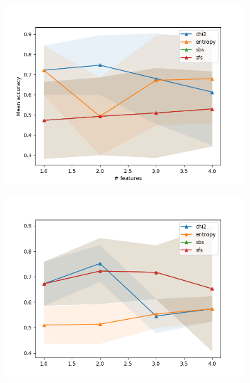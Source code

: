 \begin{figure}[htbp]
  \centering
  \begin{subfigure}[b]{0.475\textwidth}
      \centering
      \includegraphics[width=\textwidth]{../plots_with_std_fill/NBd1.png}
      \caption[]%
      {{\small}}
      \label{fig:NB_MIAS}
  \end{subfigure}
  \hfill
  \begin{subfigure}[b]{0.475\textwidth}
      \centering
      \includegraphics[width=\textwidth]{../plots_with_std_fill/NBd2.png}
      \caption[]%
      {{\small}}
      \label{fig:NB_EN}
  \end{subfigure}


\end{figure}
